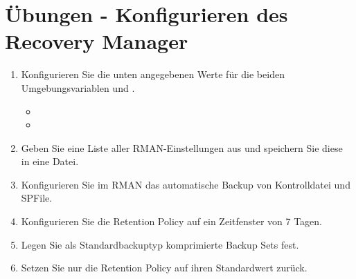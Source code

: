 \section{\"Ubungen - Konfigurieren des Recovery Manager}
  \begin{enumerate}
    \item Konfigurieren Sie die unten angegebenen Werte f\"ur die beiden Umgebungsvariablen  und .
      \begin{itemize}
        \item {}
        \item {}
      \end{itemize}
    \item Geben Sie eine Liste aller RMAN-Einstellungen aus und speichern Sie diese in eine Datei.
    \item Konfigurieren Sie im RMAN das automatische Backup von Kontrolldatei und SPFile.
    \item Konfigurieren Sie die Retention Policy auf ein Zeitfenster von 7 Tagen.
    \item Legen Sie als Standardbackuptyp komprimierte Backup Sets fest.
    \item Setzen Sie nur die Retention Policy auf ihren Standardwert zur\"uck.
  \end{enumerate}
\clearpage